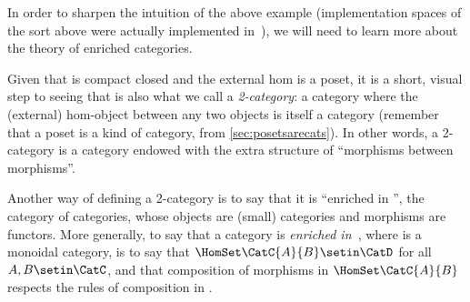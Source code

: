 In order to sharpen the intuition of the above example (implementation spaces of the sort above were actually implemented in~\cite{censi}), we will need to learn more about the theory of enriched categories.

Given that \DP is compact closed and the external hom is a poset, it is a short, visual step to seeing that \DP is also what we call a \emph{2-category}: a category where the (external) hom-object between any two objects is itself a category (remember that a poset is a kind of category, from \cref{sec:posetsarecats}).
In other words, a 2-category is a category endowed with the extra structure of ``morphisms between morphisms''.

Another way of defining a 2-category is to say that it is ``enriched in \Category'', the category of categories, whose objects are (small) categories and morphisms are functors.
More generally, to say that a category \CatC is \emph{enriched in~\CatD}, where \CatD is a monoidal category, is to say that $\HomSet\CatC{A}{B} \setin \CatD$ for all $A,B \setin \CatC$, and that composition of morphisms in $\HomSet\CatC{A}{B}$ respects the rules of composition in \CatD.

